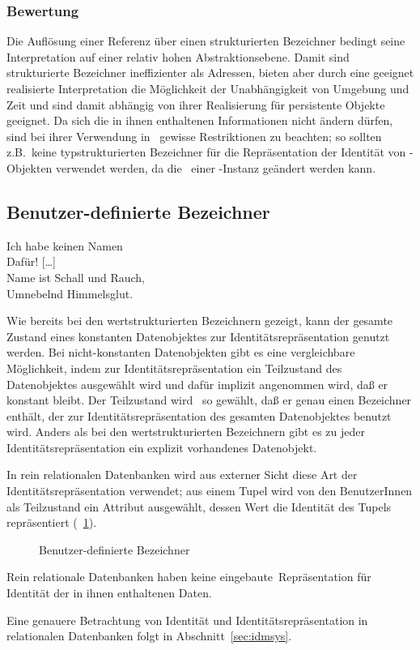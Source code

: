 \subsubsection{Bewertung}
%
Die Aufl\"{o}sung einer Referenz \"{u}ber einen strukturierten Bezeichner
bedingt seine Interpretation auf einer relativ hohen
Abstraktionsebene. Damit sind strukturierte Bezeichner ineffizienter
als Adressen, bieten aber durch eine geeignet realisierte
Interpretation die M\"{o}glichkeit der Unabh\"{a}ngigkeit von Umgebung und
Zeit und sind damit abh\"{a}ngig von ihrer Realisierung f\"{u}r persistente
Objekte geeignet. Da sich die in ihnen enthaltenen Informationen nicht
\"{a}ndern d\"{u}rfen, sind bei ihrer Verwendung in \cl\ gewisse
Restriktionen zu beachten; so sollten z.B.\ keine typstrukturierten
Bezeichner f\"{u}r die Repr\"{a}sentation der Identit\"{a}t von \clos-Objekten
verwendet werden, da die \cls\ einer \clos-Instanz ge\"{a}ndert werden
kann.
%
\subsection{Benutzer-definierte Bezeichner}
%
\begin{fortune}[6cm]
Ich habe keinen Namen\\
Daf\"{u}r! {[}\ldots{]}\\
Name ist Schall und Rauch,\\
Umnebelnd Himmelsglut.%
\end{fortune}
%
Wie bereits bei den wertstrukturierten Bezeichnern gezeigt, kann der
gesamte Zustand eines konstanten Datenobjektes zur
Identit\"{a}tsrepr\"{a}sentation genutzt werden. Bei nicht-konstanten
Datenobjekten gibt es eine vergleichbare M\"{o}glichkeit, indem zur
Identit\"{a}tsrepr\"{a}sentation ein Teilzustand des Datenobjektes
ausgew\"{a}hlt wird und daf\"{u}r implizit angenommen wird, da\ss{} er konstant
bleibt. Der Teilzustand wird \ia\ so gew\"{a}hlt, da\ss{} er
genau einen Bezeichner enth\"{a}lt, der zur Identit\"{a}tsrepr\"{a}sentation
des gesamten Datenobjektes benutzt wird. Anders als bei den
wertstrukturierten Bezeichnern gibt es zu jeder
Identit\"{a}tsrepr\"{a}sentation ein explizit vorhandenes Datenobjekt.
%
\par{}In rein relationalen Datenbanken wird aus externer Sicht diese
Art der Iden\-ti\-t\"{a}ts\-re\-pr\"{a}\-sen\-ta\-tion verwendet; aus einem
Tupel wird von den BenutzerInnen als Teilzustand ein Attribut
ausgew\"{a}hlt, dessen Wert die Identit\"{a}t des Tupels repr\"{a}sentiert
(\figurename~\ref{fig:usridnty}).
%
\begin{figure}[htbp]%
\ifbuch%
\centerline{}%
\else%
\centerline{}%
\fi%
\caption{Benutzer-definierte Bezeichner}\label{fig:usridnty}%
\end{figure}%
%
Rein relationale Datenbanken haben keine
\rglq{}eingebaute\rgrq\ Repr\"{a}sentation f\"{u}r Identit\"{a}t der in ihnen
enthaltenen Daten.
%
\par{}Eine genauere Betrachtung von Identit\"{a}t und
Identit\"{a}tsrepr\"{a}sentation in relationalen Datenbanken folgt in
Abschnitt~\ref{sec:idmsys}.
%
